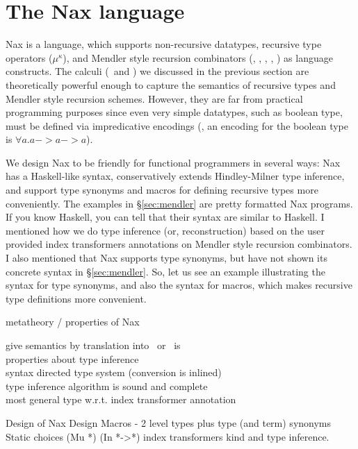 \section{The Nax language}\label{sec:Nax}

Nax is a language, which supports non-recursive datatypes, recursive type
operators ($\mu^\kappa$), and Mendler style recursion combinators (\MIt, \MPr,
\McvIt, \McvPr, \MsfIt) as language constructs. The calculi (\Fi\ and \Fixi)
we discussed in the previous section are theoretically powerful enough to
capture the semantics of recursive types and Mendler style recursion schemes.
However, they are far from practical programming purposes since even very simple
datatypes, such as boolean type, must be defined via impredicative encodings
(\eg, an encoding for the boolean type is $\forall a . a -> a -> a$).

We design Nax to be friendly for functional programmers in several ways:
Nax has a Haskell-like syntax, conservatively extends Hindley-Milner
type inference, and support type synonyms and macros for defining
recursive types more conveniently. The examples in \S\ref{sec:mendler}
are pretty formatted Nax programs. If you know Haskell, you can tell
that their syntax are similar to Haskell. I mentioned how we do
type inference (or, reconstruction) based on the user provided
index transformers annotations on Mendler style recursion combinators.
I also mentioned that Nax supports type synonyms, but have not shown
its concrete syntax in \S\ref{sec:mendler}. So, let us see an example
illustrating the syntax for type synonyms, and also the syntax for macros,
which makes recursive type definitions more convenient.



metatheory / properties of Nax

give semantics by translation into \Fi\ or \Fixw\ is \\

properties about type inference \\
syntax directed type system (conversion is inlined) \\
type inference algorithm is sound and complete \\
most general type w.r.t. index transformer annotation

Design of Nax
    Design Macros - 2 level types plus type (and term) synonyms
    Static choices (Mu *)  (In *->*)   index transformers
    kind and type inference.


